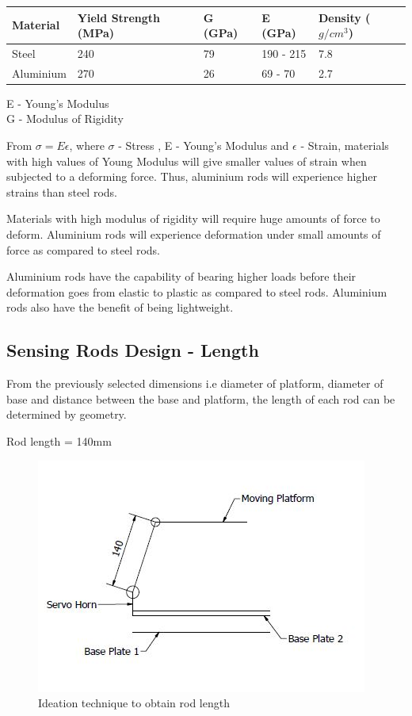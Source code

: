 \begin{tabular}{|l|l|l|l|l|}
\hline
\textbf{Material} & \textbf{Yield Strength (MPa)} & \textbf{G (GPa)} & \textbf{E (GPa)} & \textbf{Density ($g/cm^3$)}\\
\hline
Steel & 240 & 79 & 190 - 215 & 7.8\\
\hline
Aluminium & 270 & 26 & 69 - 70 & 2.7\\
\hline
\end{tabular}

E - Young's Modulus\\
G - Modulus of Rigidity

From $ \sigma = E \epsilon $, where $\sigma$ - Stress , E - Young's Modulus and $ \epsilon$ - Strain, materials with high values of Young Modulus will give smaller values of strain when subjected to a deforming force. Thus, aluminium rods will experience higher strains than steel rods.

Materials with high modulus of rigidity will require huge amounts of force to deform. Aluminium rods will experience deformation under small amounts of force as compared to steel rods.

Aluminium rods have the capability of bearing higher loads before their deformation goes from elastic to plastic as compared to steel rods. Aluminium rods also have the benefit of being lightweight.

\subsection{Sensing Rods Design - Length}
From the previously selected dimensions i.e diameter of platform, diameter of base and distance between the base and platform, the length of each rod can be determined by geometry.

Rod length = 140mm
\begin{center}
	\begin{figure}[H]
	\centering
	\includegraphics[width=0.6\linewidth]{Figures/Ideation}
	\caption[Ideation]{Ideation technique to obtain rod length}
	\end{figure}
\end{center}

